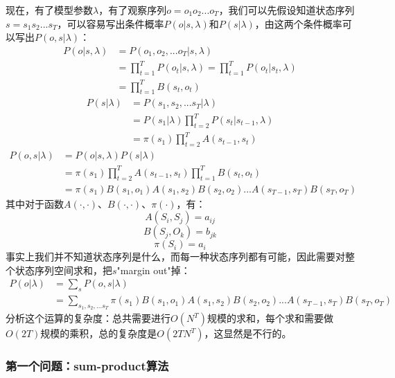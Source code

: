 \documentclass[11pt,a4paper]{article}
\begin{document}
现在，有了模型参数$\lambda$，有了观察序列$o=o_1 o_2 ... o_T$，我们可以先假设知道状态序列$s=s_1 s_2 ... s_T$，可以容易写出条件概率$P(o | s, \lambda)$和$P(s | \lambda)$，由这两个条件概率可以写出$P(o, s | \lambda)$：
\begin{equation}\begin{split}
P(o | s, \lambda)
& = P(o_1, o_2, ... o_T | s, \lambda)\\
& = \prod_{t = 1}^T P(o_t | s, \lambda) = \prod_{t = 1}^T P(o_t | s_t, \lambda)\\
& = \prod_{t = 1}^T B(s_t, o_t)
\end{split}\end{equation}
\begin{equation}\begin{split}
P(s | \lambda)
& = P(s_1, s_2, ... s_T | \lambda)\\
& = P(s_1 | \lambda) \prod_{t = 2}^T P(s_t | s_{t - 1}, \lambda)\\
& = \pi(s_1) \prod_{t = 2}^T A(s_{t - 1}, s_t)
\end{split}\end{equation}
\begin{equation}\begin{split}
P(o, s | \lambda)
& = P(o | s, \lambda) P(s | \lambda)\\
& = \pi(s_1) \prod_{t = 2}^T A(s_{t - 1}, s_t) \prod_{t = 1}^T B(s_t, o_t)\\
& = \pi(s_1) B(s_1, o_1) A(s_1, s_2) B(s_2, o_2) ... A(s_{T - 1}, s_T) B(s_T, o_T)
\end{split}\end{equation}
其中对于函数$A(\cdot, \cdot)$、$B(\cdot, \cdot)$、$\pi(\cdot)$，有：
$$ A(S_i, S_j) = a_{ij} $$
$$ B(S_j, O_k) = b_{jk} $$
$$ \pi(S_i) = a_{i} $$
事实上我们并不知道状态序列是什么，而每一种状态序列都有可能，因此需要对整个状态序列空间求和，把$s$"margin out"掉：
\begin{equation}\begin{split}
P(o | \lambda)
& = \sum_s P(o, s | \lambda)\\
& = \sum_{s_1, s_2, ... s_T} \pi(s_1) B(s_1, o_1) A(s_1, s_2) B(s_2, o_2) ... A(s_{T - 1}, s_T) B(s_T, o_T)
\end{split}\end{equation}
分析这个运算的复杂度：总共需要进行$O(N^T)$规模的求和，每个求和需要做$O(2T)$规模的乘积，总的复杂度是$O(2TN^T)$，这显然是不行的。

\subsubsection{第一个问题：sum-product算法}
\end{document}
